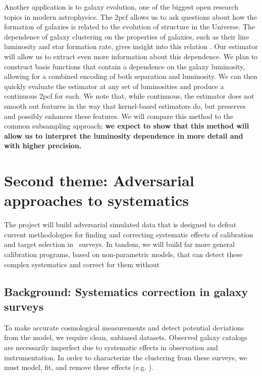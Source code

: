 \documentclass[12pt, fullpage, letterpaper]{article}
\newcommand{\cf}{2pcf\xspace}
\begin{document}
Another application is to galaxy evolution, one of the biggest open research topics in modern astrophysics.
The \cf allows us to ask questions about how the formation of galaxies is related to the evolution of structure in the Universe.
The dependence of galaxy clustering on the properties of galaxies, such as their line luminosity and star formation rate, gives insight into this relation \citep{Zehavi2004}.
Our estimator will allow us to extract even more information about this dependence. 
We plan to construct basis functions that contain a dependence on the galaxy luminosity, allowing for a combined encoding of both separation and luminosity. 
We can then quickly evaluate the estimator at any set of luminosities and produce a continuous \cf for each. 
We note that, while continuous, the estimator does not smooth out features in the way that kernel-based estimators do, but preserves and possibly enhances these features.
We will compare this method to the common subsampling approach; \textbf{we expect to show that this method will allow us to interpret the luminosity dependence in more detail and with higher precision.}

\section{Second theme: Adversarial approaches to systematics}

The project will build adversarial simulated data that is
designed to defeat current methodologies for finding and correcting
systematic effects of calibration and target selection in \LSS\ 
surveys. 
In tandem, we will build far more general calibration
programs, based on non-parametric models, that can detect these complex systematics and correct for them without

\subsection{Background: Systematics correction in galaxy surveys}

To make accurate cosmological measurements and detect potential deviations from the model, we require clean, unbiased datasets.
Observed galaxy catalogs are necessarily imperfect due to systematic effects in observation and instrumentation. 
In order to characterize the clustering from these surveys, we must model, fit, and remove these effects (e.g. \citealt{Agarwal2014}).
\end{document}
